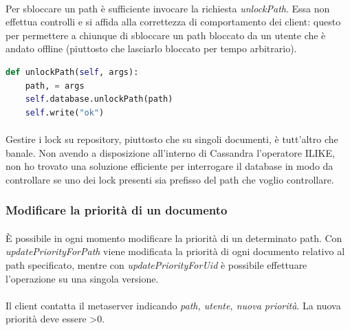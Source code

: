 \documentclass[11pt,a4paper,english]{article}
\begin{document}
\paragraph{} Per sbloccare un path è sufficiente invocare la richiesta \emph{unlockPath}. Essa non effettua controlli e si affida alla correttezza di comportamento dei client: questo per permettere a chiunque di sbloccare un path bloccato da un utente che è andato offline (piuttosto che lasciarlo bloccato per tempo arbitrario). 

\begin{lstlisting}[language=Python, title=Metaserver]
def unlockPath(self, args):
    path, = args
    self.database.unlockPath(path)
    self.write("ok")
\end{lstlisting}

\paragraph{} Gestire i lock su repository, piuttosto che su singoli documenti, è tutt'altro che banale. Non avendo a disposizione all'interno di Cassandra l'operatore ILIKE, non ho trovato una soluzione efficiente per interrogare il database in modo da controllare se uno dei lock presenti sia prefisso del path che voglio controllare. 

\subsubsection{Modificare la priorità di un documento}

\paragraph{} È possibile in ogni momento modificare la priorità di un determinato path. Con \emph{updatePriorityForPath} viene modificata la priorità di ogni documento relativo al path specificato, mentre con \emph{updatePriorityForUid} è possibile effettuare l'operazione su una singola versione. 

\paragraph{} Il client contatta il metaserver indicando \emph{path, utente, nuova priorità}. La nuova priorità deve essere >0. 
\end{document}
